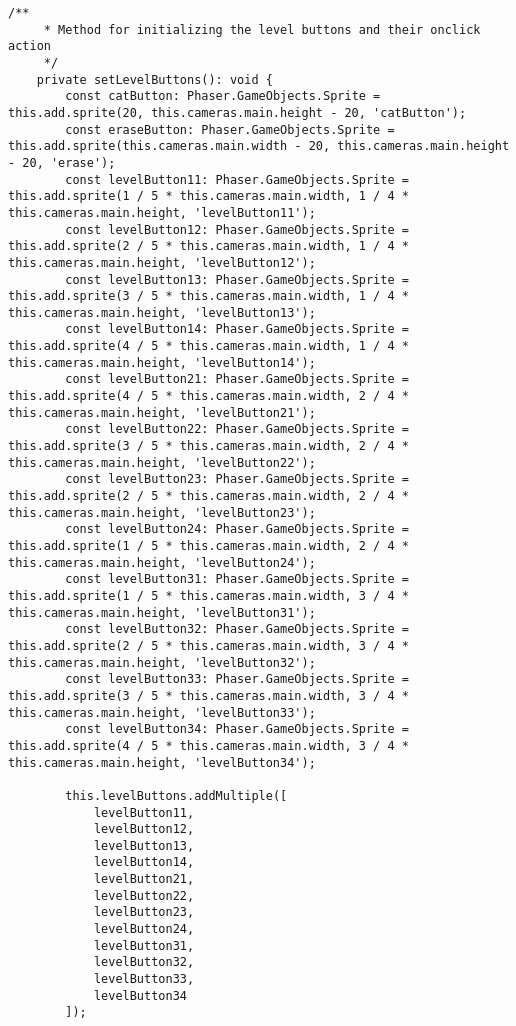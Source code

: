 \begin{lstlisting}[style=TypeScript, caption={levelMenuScene.ts}]
    /**
     * Method for initializing the level buttons and their onclick action
     */
    private setLevelButtons(): void {
        const catButton: Phaser.GameObjects.Sprite = this.add.sprite(20, this.cameras.main.height - 20, 'catButton');
        const eraseButton: Phaser.GameObjects.Sprite = this.add.sprite(this.cameras.main.width - 20, this.cameras.main.height - 20, 'erase');
        const levelButton11: Phaser.GameObjects.Sprite = this.add.sprite(1 / 5 * this.cameras.main.width, 1 / 4 * this.cameras.main.height, 'levelButton11');
        const levelButton12: Phaser.GameObjects.Sprite = this.add.sprite(2 / 5 * this.cameras.main.width, 1 / 4 * this.cameras.main.height, 'levelButton12');
        const levelButton13: Phaser.GameObjects.Sprite = this.add.sprite(3 / 5 * this.cameras.main.width, 1 / 4 * this.cameras.main.height, 'levelButton13');
        const levelButton14: Phaser.GameObjects.Sprite = this.add.sprite(4 / 5 * this.cameras.main.width, 1 / 4 * this.cameras.main.height, 'levelButton14');
        const levelButton21: Phaser.GameObjects.Sprite = this.add.sprite(4 / 5 * this.cameras.main.width, 2 / 4 * this.cameras.main.height, 'levelButton21');
        const levelButton22: Phaser.GameObjects.Sprite = this.add.sprite(3 / 5 * this.cameras.main.width, 2 / 4 * this.cameras.main.height, 'levelButton22');
        const levelButton23: Phaser.GameObjects.Sprite = this.add.sprite(2 / 5 * this.cameras.main.width, 2 / 4 * this.cameras.main.height, 'levelButton23');
        const levelButton24: Phaser.GameObjects.Sprite = this.add.sprite(1 / 5 * this.cameras.main.width, 2 / 4 * this.cameras.main.height, 'levelButton24');
        const levelButton31: Phaser.GameObjects.Sprite = this.add.sprite(1 / 5 * this.cameras.main.width, 3 / 4 * this.cameras.main.height, 'levelButton31');
        const levelButton32: Phaser.GameObjects.Sprite = this.add.sprite(2 / 5 * this.cameras.main.width, 3 / 4 * this.cameras.main.height, 'levelButton32');
        const levelButton33: Phaser.GameObjects.Sprite = this.add.sprite(3 / 5 * this.cameras.main.width, 3 / 4 * this.cameras.main.height, 'levelButton33');
        const levelButton34: Phaser.GameObjects.Sprite = this.add.sprite(4 / 5 * this.cameras.main.width, 3 / 4 * this.cameras.main.height, 'levelButton34');

        this.levelButtons.addMultiple([
            levelButton11,
            levelButton12,
            levelButton13,
            levelButton14,
            levelButton21,
            levelButton22,
            levelButton23,
            levelButton24,
            levelButton31,
            levelButton32,
            levelButton33,
            levelButton34
        ]);


\end{lstlisting}
